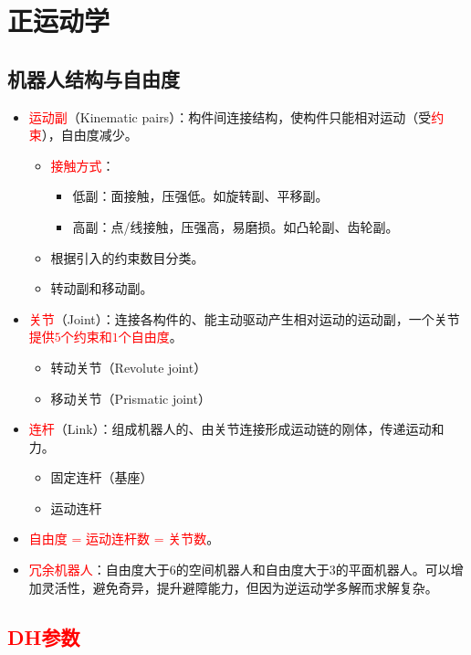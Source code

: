 \documentclass[
12pt, %
a4paper, 
oneside, %
]{scrartcl}
\begin{document}
\section{正运动学}
\subsection[机器人结构与自由度]{机器人结构与自由度}
\begin{itemize}
\item \textcolor{red}{运动副}（Kinematic pairs）：构件间连接结构，使构件只能相对运动（受\textcolor{red}{约束}），自由度减少。
\begin{itemize}
\item \textcolor{red}{接触方式}：
\begin{itemize}
\item 低副：面接触，压强低。如旋转副、平移副。
\item 高副：点/线接触，压强高，易磨损。如凸轮副、齿轮副。
\end{itemize}
\item 根据引入的约束数目分类。
\item 转动副和移动副。
\end{itemize}
\item \textcolor{red}{关节}（Joint）：连接各构件的、能主动驱动产生相对运动的运动副，一个关节\textcolor{red}{提供$ 5 $个约束和$ 1 $个自由度}。
\begin{itemize}
\item 转动关节（Revolute joint）
\item 移动关节（Prismatic joint）
\end{itemize}
\item \textcolor{red}{连杆}（Link）：组成机器人的、由关节连接形成运动链的刚体，传递运动和力。
\begin{itemize}
\item 固定连杆（基座）
\item 运动连杆
\end{itemize}
\item \textcolor{red}{自由度 = 运动连杆数 = 关节数}。
\item \textcolor{red}{冗余机器人}：自由度大于$ 6 $的空间机器人和自由度大于$ 3 $的平面机器人。可以增加灵活性，避免奇异，提升避障能力，但因为逆运动学多解而求解复杂。
\end{itemize}
\subsection[DH参数]{\textcolor{red}{DH参数}}
\end{document}
